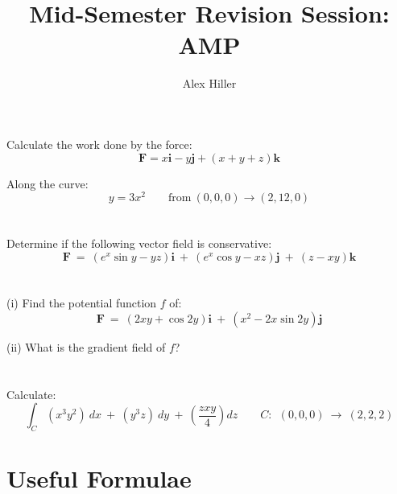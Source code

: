 \documentclass{article}
\author{Alex Hiller}
\title{Mid-Semester Revision Session: AMP}
\begin{document}
% 


\section{}

  Calculate the work done by the force:
  $$ 
    \mathbf{F} = x \mathbf{i} - y \mathbf{j} + (x + y + z) \mathbf{k}     
  $$

  Along the curve:
  $$
    y = 3x^2    \qquad \text{from} \ (0,0,0)  \rightarrow (2,12,0)
  $$

  
\clearpage


\section{}

  Determine if the following vector field is conservative:
  $$
    \mathbf{F} \ = \ (e^x \sin y - y z ) \mathbf{i} \ + \  (e^x \cos y - x z ) \mathbf{j} \ + \  (z - x y)  \mathbf{k}
  $$

\clearpage


\section{}

  (i) Find the potential function $f$ of:
    $$
      \mathbf{F} \ = \ (2xy + \cos 2y) \mathbf{i} \ + \  (x^2 - 2 x \sin 2y) \mathbf{j} 
    $$

  (ii) What is the gradient field of $f$?


\clearpage

\section{}

  Calculate: 
  $$  
    \int_C (x^3y^2) \ dx  \ + \ (y^3 z ) \ dy \ + \ (\frac{zxy}{4}) dz 
    \qquad
    C: \  \ (0,0,0) \ \rightarrow \ (2,2,2)
  $$




\clearpage

\section{Useful Formulae}
\end{document}
